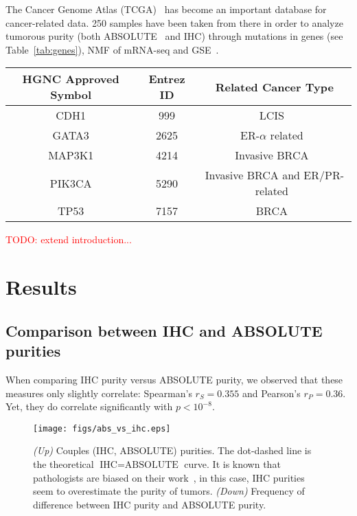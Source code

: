 \documentclass[letterpaper]{article}
\newcommand{\TODO}[1]{\textcolor{red}{TODO: {#1}}}
\begin{document}
The Cancer Genome Atlas (TCGA)~\citep{weinstein2013cancer} has become an important database for cancer-related data. 250 samples have been taken from there in order to
analyze tumorous purity (both ABSOLUTE~\citep{carter2012absolute} and IHC) through mutations in genes (see Table~\ref{tab:genes}), NMF of mRNA-seq
and GSE~\citep{subramanian2005gene}.

\begin{table*}[!t]
\centering
\vspace{-.5cm}
\begin{tabular}{c|c|c}
HGNC Approved Symbol & Entrez ID & Related Cancer Type \\ \hline \hline
CDH1 & 999 & LCIS~\citep{berx1998mutations} \\ \hline
GATA3 & 2625 & ER-$\alpha$ related~\citep{ciocca2009significance} \\ \hline
MAP3K1 & 4214 & Invasive BRCA~\citep{easton2007genome} \\ \hline
PIK3CA & 5290 & Invasive BRCA and ER/PR-related~\citep{saal2005pik3ca} \\ \hline
TP53 & 7157 & BRCA~\citep{gasco2002p53}
\end{tabular}
\caption{Genes considered in this study with both their HGNC symbol which (used further down) and their Entrez ID.\label{tab:genes}}
\end{table*}

\TODO{extend introduction...}

\newpage
\section{Results}
\subsection{Comparison between IHC and ABSOLUTE purities}
When comparing IHC purity versus ABSOLUTE purity, we observed that these measures only slightly correlate: Spearman's $r_S = 0.355$ and Pearson's $r_P = 0.36$.
Yet, they do correlate significantly with $p < 10^{-8}$.

\begin{figure}[!h]
\hspace{-.6cm}
\texttt{[image: figs/abs\_vs\_ihc.eps]}
\caption{\textit{(Up)} Couples (IHC, ABSOLUTE) purities. The dot-dashed line is the theoretical $\text{IHC} = \text{ABSOLUTE}$ curve. It is known that pathologists
are biased on their work~\citep{fandel2008we}, in this case, IHC purities seem to overestimate the purity of tumors.
\textit{(Down)} Frequency of difference between IHC purity and ABSOLUTE purity.\label{fig:abs vs ihc}}
\end{figure}
\end{document}
